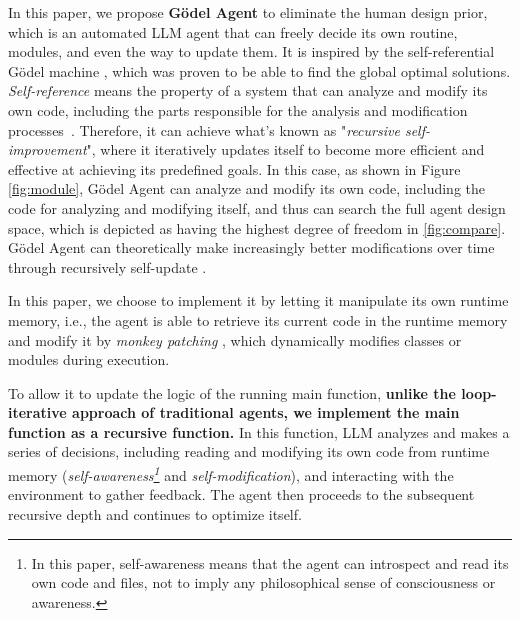 \documentclass[11pt]{article}
\newcommand{\godel}{G\"odel\xspace}
\newcommand{\framework}{Gödel Agent\xspace}
\begin{document}
In this paper, we propose \textbf{\framework} to eliminate the human design prior, which is an automated LLM agent that can freely decide its own routine, modules, and even the way to update them. 
It is inspired by the self-referential \godel machine \citep{schmidhuber2003godel}, which was proven to be able to find the global optimal solutions. 
\textit{Self-reference} means the property of a system that can analyze and modify its own code, including the parts responsible for the analysis and modification processes~\citep{astrachan1994self}. Therefore, it can achieve what's known as "\textit{recursive self-improvement}", where it iteratively updates itself to become more efficient and effective at achieving its predefined goals. In this case, as shown in Figure \ref{fig:module}, \framework can analyze and modify its own code, including the code for analyzing and modifying itself, and thus can search the full agent design space, which is depicted as having the highest degree of freedom in \cref{fig:compare}. \framework can theoretically make increasingly better modifications over time through recursively self-update \citep{wang2018formulationrecursiveselfimprovementpossible}. 
















In this paper, we choose to implement it by letting it manipulate its own runtime memory, i.e., the agent is able to retrieve its current code in the runtime memory and modify it by \textit{monkey patching} \citep{archiveMonkeyPatching}, which dynamically modifies classes or modules during execution.


To allow it to update the logic of the running main function, \textbf{unlike the loop-iterative approach of traditional agents, we implement the main function as a recursive function.}
In this function, LLM analyzes and makes a series of decisions, including reading and modifying its own code from runtime memory (\textit{self-awareness\footnote{In this paper, self-awareness means that the agent can introspect and read its own code and files, not to imply any philosophical sense of consciousness or awareness.}} and \textit{self-modification}), and interacting with the environment to gather feedback. The agent then proceeds to the subsequent recursive depth and continues to optimize itself. 
\end{document}
